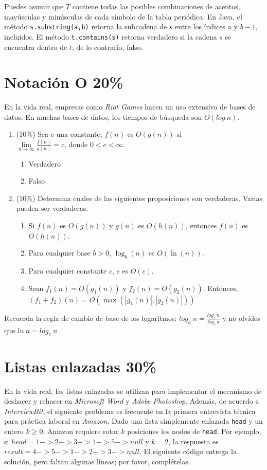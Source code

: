 \documentclass[10 pt]{article}
\begin{document}
\begin{multicols}{2}
Puedes asumir que $T$ contiene todas las posibles combinaciones de acentos, mayúsculas y minúsculas de cada símbolo de la tabla periódica. En Java, el método \texttt{s.substring(a,b)} retorna la subcadena de $s$ entre los índices $a$ y $b-1$, incluídos. El método \texttt{t.contains(s)} retorna verdadero si la cadena $s$ se encuentra dentro de $t$; de lo contrario, falso.

		\section{Notación O 20\%}
En la vida real, empresas como \textit{Riot Games} hacen un uso extensivo de bases de datos. En muchas bases de datos, los tiempos de búsqueda son $O(log\ n)$. 

		\begin{enumerate}[label=\Alph*]
			\item (10\%) Sea $c$ una constante, $f(n)$ es $O(g(n))$ si \\ $\lim\limits_{n \rightarrow \infty}\frac{f(n)}{g(n)} = c$, donde $0 < c < \infty$.
			\begin{enumerate}
				\item Verdadero
				\item Falso
			\end{enumerate}
			\item (10\%) Determina cuales de las siguientes proposiciones son verdaderas. Varias pueden ser verdaderas.
			\begin{enumerate}
				\item Si $f(n)$ es $O(g(n))$ y $g(n)$ es $O(h(n))$, entonces $f(n)$ es $O(h(n))$.
				\item Para cualquier base $b > 0$, $\log_b(n)$ es $O(\ln(n))$.
				\item Para cualquier constante $c$, $c$ es $O(c)$.
				\item Sean $f_1(n) = O(g_1(n))$ y $f_2(n) = O(g_2(n))$. Entonces, $(f_1 + f_2)(n) = O(\max(|g_1(n)|, |g_2(n)|))$ 
			\end{enumerate}
		\end{enumerate}

Recuerda la regla de cambio de base de los logaritmos: $log_a\ n = \frac{log_c\ n}{log_c\ a}$ y no olvides que $ln\ n = log_e\ n$

		\section{Listas enlazadas 30\%}
		En la vida real, las listas enlazadas se utilizan para implementar el mecanismo de deshacer y rehacer en \textit{Microsoft Word} y \textit{Adobe Photoshop}. Además, de acuerdo a \textit{InterviewBit}, el siguiente problema es frecuente en la primera entrevista técnica para práctica laboral  en \textit{Amazon}.  Dado una lista simplemente enlazada \texttt{head} y un entero $k \geq 0$, Amazon requiere rotar $k$ posiciones los nodos de \texttt{head}. Por ejemplo, si $head = 1 -> 2 -> 3 -> 4 -> 5 -> null$ y $k = 2$, la respuesta es $result = 4->5->1->2->3->null$. El siguiente código entrega la solución, pero faltan algunas líneas; por favor, complételas.


\end{multicols}
\end{document}
